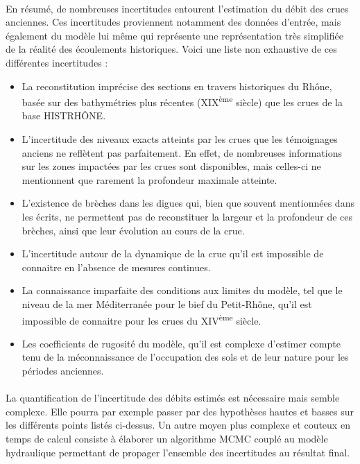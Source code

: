 \documentclass[11pt]{article}
\begin{document}
	\paragraph{} En résumé, de nombreuses incertitudes entourent l'estimation du débit des crues anciennes. Ces incertitudes proviennent notamment des données d'entrée, mais également du modèle lui même qui représente une représentation très simplifiée de la réalité des écoulements historiques. Voici une liste non exhaustive de ces différentes incertitudes :
	
	\begin{itemize}
		\item La reconstitution imprécise des sections en travers historiques du Rhône, basée sur des bathymétries plus récentes (XIX\textsuperscript{ème} siècle) que les crues de la base HISTRHÔNE.
		\item L'incertitude des niveaux exacts atteints par les crues que les témoignages anciens ne reflètent pas parfaitement. En effet, de nombreuses informations sur les zones impactées par les crues sont disponibles, mais celles-ci ne mentionnent que rarement la profondeur maximale atteinte.
		\item  L'existence de brèches dans les digues qui, bien que souvent mentionnées dans les écrits, ne permettent pas de reconstituer la largeur et la profondeur de ces brèches, ainsi que leur évolution au cours de la crue.
		\item L'incertitude autour de la dynamique de la crue qu'il est impossible de connaitre en l'absence de mesures continues.
		\item La connaissance imparfaite des conditions aux limites du modèle, tel que le niveau de la mer Méditerranée pour le bief du Petit-Rhône, qu'il est impossible de connaitre pour les crues du XIV\textsuperscript{ème} siècle.
		\item Les coefficients de rugosité du modèle, qu'il est complexe d'estimer compte tenu de la méconnaissance de l'occupation des sols et de leur nature pour les périodes anciennes.	
	\end{itemize}
		
	\paragraph{} La quantification de l'incertitude des débits estimés est nécessaire mais semble complexe. Elle pourra par exemple passer par des hypothèses hautes et basses sur les différents points listés ci-dessus. Un autre moyen plus complexe et couteux en temps de calcul consiste à élaborer un algorithme MCMC couplé au modèle hydraulique permettant de propager l'ensemble des incertitudes au résultat final.	
	
\end{document}
